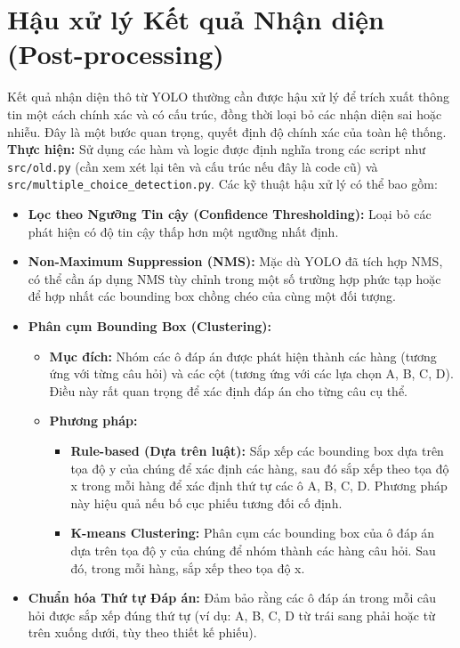 \section{Hậu xử lý Kết quả Nhận diện (Post-processing)}
\label{sec:post_processing}
Kết quả nhận diện thô từ YOLO thường cần được hậu xử lý để trích xuất thông tin một cách chính xác và có cấu trúc, đồng thời loại bỏ các nhận diện sai hoặc nhiễu. Đây là một bước quan trọng, quyết định độ chính xác của toàn hệ thống.
\textbf{Thực hiện:}
Sử dụng các hàm và logic được định nghĩa trong các script như \texttt{src/old.py} (cần xem xét lại tên và cấu trúc nếu đây là code cũ) và \texttt{src/multiple\_choice\_detection.py}. Các kỹ thuật hậu xử lý có thể bao gồm:
\begin{itemize}
    \item \textbf{Lọc theo Ngưỡng Tin cậy (Confidence Thresholding):} Loại bỏ các phát hiện có độ tin cậy thấp hơn một ngưỡng nhất định.
    \item \textbf{Non-Maximum Suppression (NMS):} Mặc dù YOLO đã tích hợp NMS, có thể cần áp dụng NMS tùy chỉnh trong một số trường hợp phức tạp hoặc để hợp nhất các bounding box chồng chéo của cùng một đối tượng.
    \item \textbf{Phân cụm Bounding Box (Clustering):}
        \begin{itemize}
            \item \textbf{Mục đích:} Nhóm các ô đáp án được phát hiện thành các hàng (tương ứng với từng câu hỏi) và các cột (tương ứng với các lựa chọn A, B, C, D). Điều này rất quan trọng để xác định đáp án cho từng câu cụ thể.
            \item \textbf{Phương pháp:}
                \begin{itemize}
                    \item \textbf{Rule-based (Dựa trên luật):} Sắp xếp các bounding box dựa trên tọa độ y của chúng để xác định các hàng, sau đó sắp xếp theo tọa độ x trong mỗi hàng để xác định thứ tự các ô A, B, C, D. Phương pháp này hiệu quả nếu bố cục phiếu tương đối cố định.
                    \item \textbf{K-means Clustering:} Phân cụm các bounding box của ô đáp án dựa trên tọa độ y của chúng để nhóm thành các hàng câu hỏi. Sau đó, trong mỗi hàng, sắp xếp theo tọa độ x.
                \end{itemize}
        \end{itemize}
    \item \textbf{Chuẩn hóa Thứ tự Đáp án:} Đảm bảo rằng các ô đáp án trong mỗi câu hỏi được sắp xếp đúng thứ tự (ví dụ: A, B, C, D từ trái sang phải hoặc từ trên xuống dưới, tùy theo thiết kế phiếu).

\end{itemize}
